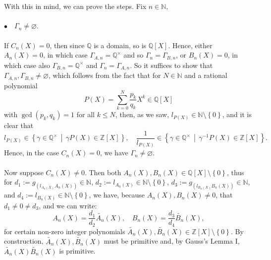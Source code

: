 \documentclass[11pt, a4paper, oneside]{article}
\theoremstyle{remark}
\theoremstyle{lemma}
\begin{document}
\\\\
With this in mind, we can prove the steps. Fix \( n \in \mathbb{N} \),
\\\\
\(\bullet\quad \Gamma_n \neq \varnothing\).
\\\\
If \( C_n(X) = 0 \), then since \( \mathbb{Q} \) is a domain, so is \( \mathbb{Q}[X] \). Hence, either \( A_n(X) = 0 \), in which case \( \Gamma_{A,n} = \mathbb{Q}^{\times} \) and so \( \Gamma_n = \Gamma_{B,n} \), or \( B_n(X) = 0 \), in which case also \( \Gamma_{B,n} = \mathbb{Q}^{\times} \) and \( \Gamma_n = \Gamma_{A,n} \). So it suffices to show that \( \Gamma_{A,n}, \Gamma_{B,n} \neq \varnothing \), which follows from the fact that for \( N \in \mathbb{N} \) and a rational polynomial
\[
P(X) = \sum_{k=0}^{N} \frac{p_k}{q_k} X^{k} \in \mathbb{Q}[X]
\]
with \( \gcd(p_k, q_k) = 1 \) for all \( k \leq N \), then, as we saw, \( l_{P(X)} \in \mathbb{N} \setminus \left\{ 0 \right\} \), and it is clear that
\[
l_{P(X)} \in \left\{ \gamma \in \mathbb{Q}^{\times} \,\middle|\, \gamma P(X) \in \mathbb{Z}[X] \right\}, \quad \frac{1}{l_{P(X)}} \in \left\{ \gamma \in \mathbb{Q}^{\times} \,\middle|\, \gamma^{-1} P(X) \in \mathbb{Z}[X] \right\}.
\]
Hence, in the case \( C_n(X) = 0 \), we have \( \Gamma_n \neq \varnothing \).
\\\\
Now suppose \( C_n\left( X \right) \neq 0 \). Then both \( A_n\left( X \right), B_n\left( X \right) \in \mathbb{Q}\left[ X \right] \setminus \left\{ 0 \right\} \), thus for \( d_1 := g_{\left( l_{A_n\left( X \right)} A_n\left( X \right) \right)} \in \mathbb{N} \), \( d_2 := l_{A_n\left( X \right)} \in \mathbb{N} \setminus \left\{ 0 \right\} \), \( d_3 := g_{\left( l_{B_n\left( X \right)} B_n\left( X \right) \right)} \in \mathbb{N} \), and \( d_4 := l_{B_n\left( X \right)} \in \mathbb{N} \setminus \left\{ 0 \right\} \), we have, because \( A_n\left( X \right), B_n\left( X \right) \neq 0 \), that \( d_1 \neq 0 \neq d_3 \), and we can write:
\[
A_n\left( X \right) = \frac{d_1}{d_2} \widetilde{A_n}\left( X \right), \quad B_n\left( X \right) = \frac{d_3}{d_4} \widetilde{B_n}\left( X \right),
\]
for certain non-zero integer polynomials \( \widetilde{A_n}\left( X \right), \widetilde{B_n}\left( X \right) \in \mathbb{Z}\left[ X \right] \setminus \left\{ 0 \right\} \). By construction, \( \widetilde{A_n}\left( X \right), \widetilde{B_n}\left( X \right) \) must be primitive and, by Gauss's Lemma I, \( \widetilde{A_n}\left( X \right) \widetilde{B_n}\left( X \right) \) is primitive.
\end{document}

